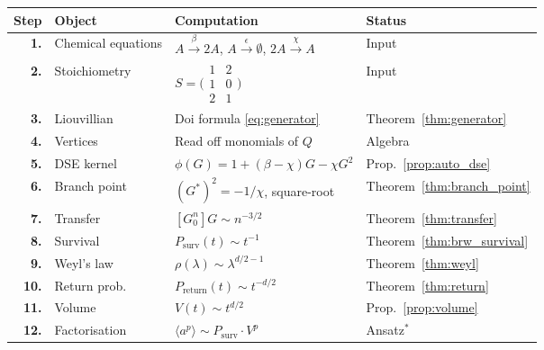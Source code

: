 \documentclass[11pt,a4paper]{article}
\theoremstyle{definition}
\newcommand{\Psurv}{P_{\mathrm{surv}}}
\newcommand{\Preturn}{P_{\mathrm{return}}}
\begin{document}
\begin{tcolorbox}[
  colback=blue!3, colframe=deepblue, arc=4pt,
  title={\textbf{Complete AC Route: Chemical Equation $\to$ Critical Exponents}},
  fonttitle=\bfseries\color{white},
  coltitle=white,
  breakable
]
\renewcommand{\arraystretch}{1.4}
\begin{tabular}{@{}rlp{5.5cm}l@{}}
\textbf{Step} & \textbf{Object} & \textbf{Computation} & \textbf{Status} \\
\midrule
\textbf{1.} & Chemical equations &
$A \xrightarrow{\beta} 2A$, \;
$A \xrightarrow{\epsilon} \emptyset$, \;
$2A \xrightarrow{\chi} A$ & Input \\

\textbf{2.} & Stoichiometry &
$S = \bigl(\begin{smallmatrix}1&2\\1&0\\2&1\end{smallmatrix}\bigr)$ & Input \\

\textbf{3.} & Liouvillian &
Doi formula \eqref{eq:generator}
& Theorem~\ref{thm:generator} \\

\textbf{4.} & Vertices &
Read off monomials of $Q$
& Algebra \\

\textbf{5.} & DSE kernel &
$\phi(G) = 1 + (\beta{-}\chi)G - \chi G^2$
& Prop.~\ref{prop:auto_dse} \\

\textbf{6.} & Branch point &
$(G^*)^2 = -1/\chi$, square-root
& Theorem~\ref{thm:branch_point} \\

\textbf{7.} & Transfer &
$[G_0^n]G \sim n^{-3/2}$
& Theorem~\ref{thm:transfer} \\

\textbf{8.} & Survival &
$\Psurv(t) \sim t^{-1}$
& Theorem~\ref{thm:brw_survival} \\

\textbf{9.} & Weyl's law &
$\rho(\lambda) \sim \lambda^{d/2-1}$
& Theorem~\ref{thm:weyl} \\

\textbf{10.} & Return prob. &
$\Preturn(t) \sim t^{-d/2}$
& Theorem~\ref{thm:return} \\

\textbf{11.} & Volume &
$V(t) \sim t^{d/2}$
& Prop.~\ref{prop:volume} \\

\textbf{12.} & Factorisation &
$\langle a^p \rangle \sim \Psurv \cdot V^p$
& Ansatz$^*$ \\


\end{tabular}
\end{tcolorbox}
\end{document}
